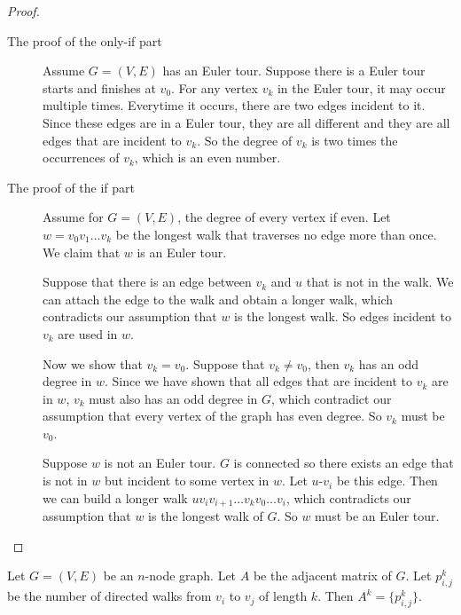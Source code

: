 \documentclass[11pt]{article}
\begin{document}
\begin{proof}
\begin{description}
\item[The proof of the only-if part] Assume $G=(V,E)$ has an Euler tour. Suppose there is a
Euler tour starts and finishes at $v_0$. For any vertex $v_k$ in the Euler tour, it may occur
multiple times. Everytime it occurs, there are two edges incident to it. Since these edges are in
a Euler tour, they are all different and they are all edges that are incident to $v_k$. So the
degree of $v_k$ is two times the occurrences of $v_k$, which is an even number.

\item[The proof of the if part] Assume for $G=(V,E)$, the degree of every vertex if even. Let
$w = v_0v_1 \dots v_k$ be the longest walk that traverses no edge more than once. We claim that
$w$ is an Euler tour.

Suppose that there is an edge between $v_k$ and $u$ that is not in the walk. We can attach the edge
to the walk and obtain a longer walk, which contradicts our assumption that $w$ is the longest
walk. So edges incident to $v_k$ are used in $w$.

Now we show that $v_k=v_0$. Suppose that $v_k \neq v_0$, then $v_k$ has an odd degree in $w$.
Since we have shown that all edges that are incident to $v_k$ are in $w$, $v_k$ must also has an
odd degree in $G$, which contradict our assumption that every vertex of the graph has even degree.
So $v_k$ must be $v_0$.

Suppose $w$ is not an Euler tour. $G$ is connected so there exists an edge that is not in $w$ but
incident to some vertex in $w$. Let $u$-$v_i$ be this edge. Then we can build a longer walk
$uv_iv_{i+1} \dots v_kv_0 \dots v_i$, which contradicts our assumption that $w$ is the longest walk
of $G$. So $w$ must be an Euler tour.
\end{description}
\end{proof}

\begin{theorem}
Let $G=(V,E)$ be an $n$-node graph. Let $A$ be the adjacent matrix of $G$. Let $p_{i,j}^k$ be the
number of directed walks from $v_i$ to $v_j$ of length $k$. Then $A^k = \{p_{i,j}^k\}$.
\end{theorem}
\end{document}
